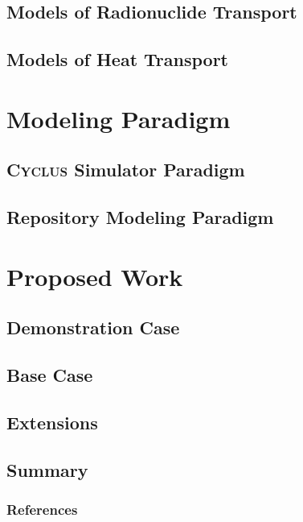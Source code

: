\documentclass[9pt]{beamer}
\begin{document}
\subsection{Models of Radionuclide Transport}

\subsection{Models of Heat Transport}

\section{Modeling Paradigm}
\subsection{\textsc{Cyclus} Simulator Paradigm}

\subsection{Repository Modeling Paradigm}

\section{Proposed Work}
\subsection{Demonstration Case}

\subsection{Base Case}

\subsection{Extensions}

\subsection{Summary}



\begin{frame}[allowframebreaks]
  \frametitle{References}
  
  {\footnotesize }
\end{frame}
\end{document}

